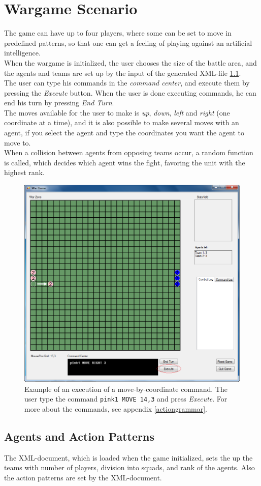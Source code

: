 \section{Wargame Scenario}
\label{sec:wargame}

The game can have up to four players, where some can be set to move in predefined patterns, so that one can get a feeling of playing against an artificial intelligence.\\ \indent
	When the wargame is initialized, the user chooses the size of the battle area, and the agents and teams are set up by the input of the generated XML-file \ref{agents_patterns}.\\ \indent
	The user can type his commands in the \textit{command center}, and execute them by pressing the \textit{Execute} button. When the user is done executing commands, he can end his turn by pressing \textit{End Turn}.\\ \indent
	The moves available for the user to make is \textit{up}, \textit{down}, \textit{left} and \textit{right} (one coordinate at a time), and it is also possible to make several moves with an agent, if you select the agent and type the coordinates you want the agent to move to.\\ \indent
  When a collision between agents from opposing teams occur, a random function is called, which decides which agent wins the fight, favoring the unit with the highest rank.
	
\begin{figure}[H]
\begin{center}
\includegraphics[scale=0.6]{Images/ex_com.png}
\end{center}
\caption{Example of an execution of a move-by-coordinate command. The user type the command \texttt{pink1 MOVE 14,3} and press \textit{Execute}. For more about the commands, see appendix \ref{actiongrammar}.}
\label{fig:ex_com}
\end{figure}

\subsection{Agents and Action Patterns}
\label{agents_patterns}

The XML-document, which is loaded when the game initialized, sets the up the teams with number of players, division into squads, and rank of the agents. Also the action patterns are set by the XML-document.